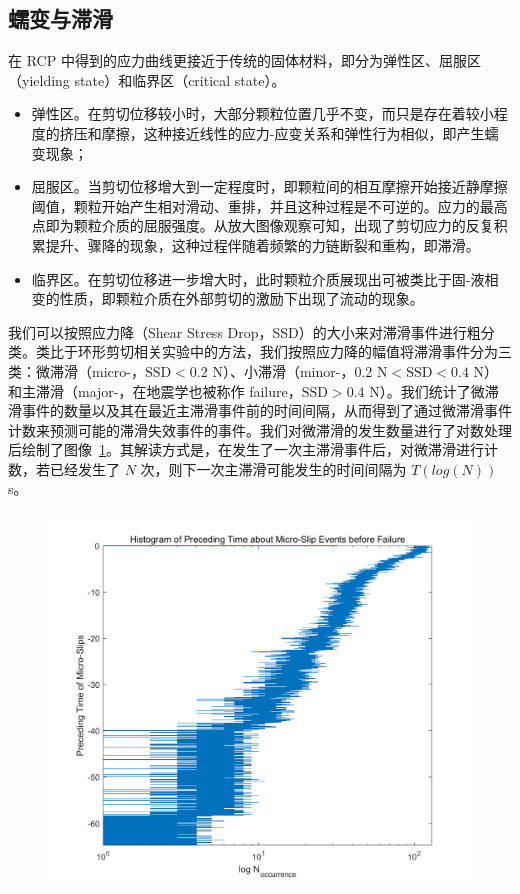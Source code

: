\subsection{蠕变与滞滑}

在 RCP 中得到的应力曲线更接近于传统的固体材料，即分为弹性区、屈服区（yielding state）和临界区（critical state）。

\begin{itemize}
  \item 弹性区。在剪切位移较小时，大部分颗粒位置几乎不变，而只是存在着较小程度的挤压和摩擦，这种接近线性的应力-应变关系和弹性行为相似，即产生蠕变现象；
  \item 屈服区。当剪切位移增大到一定程度时，即颗粒间的相互摩擦开始接近静摩擦阈值，颗粒开始产生相对滑动、重排，并且这种过程是不可逆的。应力的最高点即为颗粒介质的屈服强度。从放大图像观察可知，出现了剪切应力的反复积累提升、骤降的现象，这种过程伴随着频繁的力链断裂和重构，即滞滑。
  \item 临界区。在剪切位移进一步增大时，此时颗粒介质展现出可被类比于固-液相变的性质，即颗粒介质在外部剪切的激励下出现了流动的现象。
\end{itemize}

我们可以按照应力降（Shear Stress Drop，SSD）的大小来对滞滑事件进行粗分类。类比于环形剪切相关实验中的方法，我们按照应力降的幅值将滞滑事件分为三类：微滞滑（micro-，$\text{SSD}<0.2$ \unit{\newton}）、小滞滑（minor-，0.2 \unit{\newton}$<\text{SSD}<0.4$ \unit{\newton}）和主滞滑（major-，在地震学也被称作 failure，$\text{SSD}>0.4$ \unit{\newton}）。我们统计了微滞滑事件的数量以及其在最近主滞滑事件前的时间间隔，从而得到了通过微滞滑事件计数来预测可能的滞滑失效事件的事件。我们对微滞滑的发生数量进行了对数处理后绘制了图像~\ref{fig:preceding_interval}。其解读方式是，在发生了一次主滞滑事件后，对微滞滑进行计数，若已经发生了 $N$ 次，则下一次主滞滑可能发生的时间间隔为 $T(log{(N)})$ \unit{s}。

\begin{figure}[!htp]
  \centering
  \includegraphics[height=10cm]{figures/4_preceding_interval.png}
  \label{fig:preceding_interval}
\end{figure}

